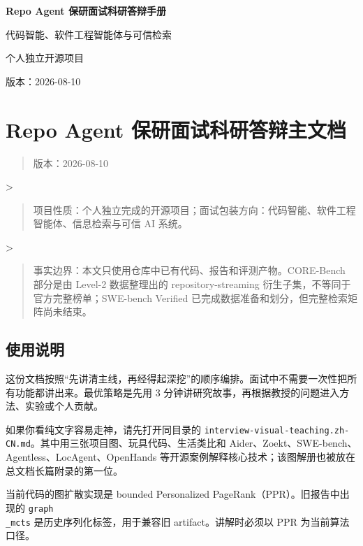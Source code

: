 \documentclass[UTF8,12pt,openany]{ctexbook}
\begin{document}
\frontmatter
\begin{titlepage}
\centering
\vspace*{3cm}
{\Huge\bfseries Repo Agent 保研面试科研答辩手册\par}
\vspace{1.5cm}
{\Large 代码智能、软件工程智能体与可信检索\par}
\vfill
{\large 个人独立开源项目\par}
{\large 版本：2026-08-10\par}
\end{titlepage}
\tableofcontents
\mainmatter
\clearpage
\chapter{Repo Agent 保研面试科研答辩主文档}

\begin{quote}
版本：2026-08-10
\end{quote}
>\par
\begin{quote}
项目性质：个人独立完成的开源项目；面试包装方向：代码智能、软件工程智能体、信息检索与可信 AI 系统。
\end{quote}
>\par
\begin{quote}
事实边界：本文只使用仓库中已有代码、报告和评测产物。CORE-Bench 部分是由 Level-2 数据整理出的 repository-streaming 衍生子集，不等同于官方完整榜单；SWE-bench Verified 已完成数据准备和划分，但完整检索矩阵尚未结束。
\end{quote}

\section{使用说明}

这份文档按照“先讲清主线，再经得起深挖”的顺序编排。面试中不需要一次性把所有功能都讲出来。最优策略是先用 3 分钟讲研究故事，再根据教授的问题进入方法、实验或个人贡献。\par

如果你看纯文字容易走神，请先打开同目录的 \texttt{interview-visual-teaching.zh-CN.md}。其中用三张项目图、玩具代码、生活类比和 Aider、Zoekt、SWE-bench、Agentless、LocAgent、OpenHands 等开源案例解释核心技术；该图解册也被放在总文档长篇附录的第一位。\par

当前代码的图扩散实现是 bounded Personalized PageRank（PPR）。旧报告中出现的 \texttt{graph\\_mcts} 是历史序列化标签，用于兼容旧 artifact。讲解时必须以 PPR 为当前算法口径。\par
\end{document}
